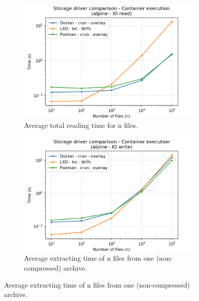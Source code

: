 \begin{figure}[h!]
    \begin{subfigure}{.5\textwidth}
      \centering
      \includegraphics[width=\linewidth]{images/manager/manager-execution-alpine---IO-read.png}
      \caption{Average total reading time for n files.}
      \label{fig:manager:io-read-exec}
    \end{subfigure}
    \begin{subfigure}{.5\textwidth}
      \centering
      \includegraphics[width=\linewidth]{images/manager/manager-execution-alpine---IO-write.png}
      \caption{Average extracting time of n files from one (non-compressed) archive.}
      \label{fig:manager:io-write-exec}
    \end{subfigure}
    

\end{figure}

